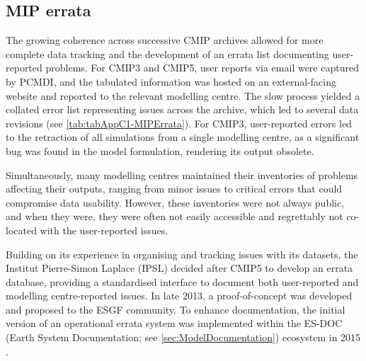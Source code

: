\documentclass[manuscript]{copernicus}
\newcommand{\mycomment}[1]{}
\def\cred#1{{\color{red}#1}}
\begin{document}
\mycomment{
Imperfect:
CMIP3, single node, single report, 2004-2008
CMIP5, 30 nodes, 7 reporting statistics (all CMIP6 data node), 2018-present (missing 2010-2015, 2015-2018)
CMIP6, 30 nodes, 9 reporting statistics, 2018-present
Number of downloads (how time split across files matters), or per GB downloads
}


\subsection{MIP errata}
\label{sec:CMIPErrata}

The growing coherence across successive CMIP archives allowed for more complete data tracking and the development of an errata list documenting user-reported problems. For CMIP3 and CMIP5, user reports via email were captured by PCMDI, and the tabulated information was hosted on an external-facing website and reported to the relevant modelling centre. The slow process yielded a collated error list representing issues across the archive, which led to several data revisions (see \autoref{tab:tabAppC1-MIPErrata}). For CMIP3, user-reported errors led to the retraction of all simulations from a single modelling centre, as a significant bug was found in the model formulation, rendering its output obsolete.

Simultaneously, many modelling centres maintained their inventories of problems affecting their outputs, ranging from minor issues to critical errors that could compromise data usability. However, these inventories were not always public, and when they were, they were often not easily accessible and regrettably not co-located with the user-reported issues.

Building on its experience in organising and tracking issues with its datasets, the Institut Pierre-Simon Laplace (IPSL) decided after CMIP5 to develop an errata database, providing a standardised interface to document both user-reported and modelling centre-reported issues. In late 2013, a proof-of-concept was developed and proposed to the ESGF community. To enhance documentation, the initial version of an operational errata system was implemented within the ES-DOC (Earth System Documentation; see \autoref{sec:ModelDocumentation}) ecosystem in 2015 \citep{pascoe_documenting_2020}.
\end{document}
